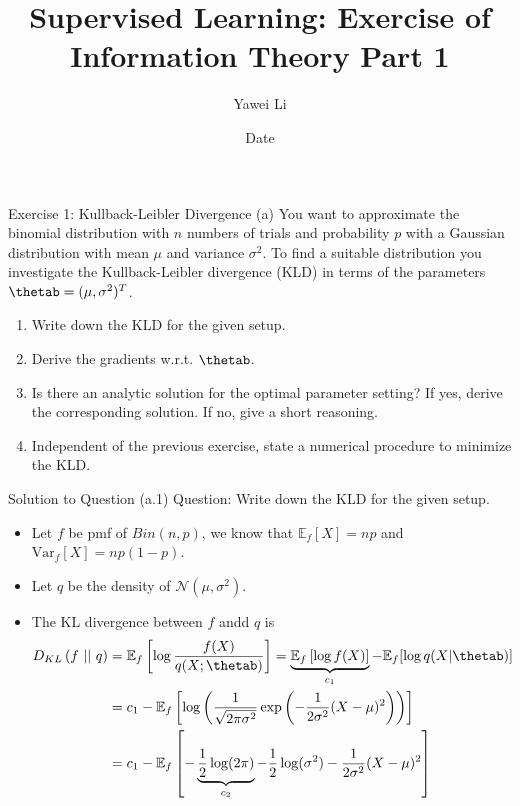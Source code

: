 \documentclass[aspectratio=169]{beamer}
\title[]{\textbf{Supervised Learning: Exercise of \\ Information Theory Part 1}}
\author{Yawei Li}
\institute[LMU]
{
\\
  \texttt{yawei.li@stat.uni-muenchen.de}
}
\date{Date}
\newcommand{\kld}[1]{D_{KL}\left(#1\right)}
\newcommand{\Ef}{\mathbb{E}_f}
\newcommand{\Varf}{\mathrm{Var}_f}
\begin{document}
\begin{frame}
\titlepage

\end{frame}


\begin{frame}{Exercise 1: Kullback-Leibler Divergence}
	(a) You want to approximate the binomial distribution with $n$ numbers of trials and probability $p$ with a Gaussian distribution with mean $\mu$ and variance $\sigma^2$. To find a suitable distribution you investigate the Kullback-Leibler divergence (KLD) in terms of the parameters $\thetab = (\mu, \sigma^2)^T$.
	\begin{enumerate}
		\item Write down the KLD for the given setup.
		\item Derive the gradients w.r.t. $\thetab$.
		\item Is there an analytic solution for the optimal parameter setting? If yes, derive the corresponding solution. If no, give a short reasoning.
		\item Independent of the previous exercise, state a numerical procedure to minimize the KLD.
	\end{enumerate}
\end{frame}

\begin{frame}{Solution to Question (a.1)}
	\small
	Question: Write down the KLD for the given setup.
	
	\begin{itemize}
		\item Let $f$ be pmf of $Bin(n, p)$, we know that $\Ef[X] = np$ and $\Varf[X] = np (1 - p)$.
		\item Let $q$ be the density of $\mathcal{N}(\mu, \sigma^2)$.
		\item The KL divergence between $f$ andd $q$ is
		\begin{align*}
			\kld{f \ || \ q} 
			&= \Ef \left[ \log \frac{f(X)}{q(X; \thetab)} \right] = \underbrace{\Ef \left[ \log f(X) \right]}_{c_1} - \Ef [\log q(X|\thetab)] \\
			&= c_1 - \Ef \left[ \log \left( \frac{1}{\sqrt{2 \pi \sigma^2}} \exp \left( - \frac{1}{2\sigma^2} (X - \mu)^2 \right)  \right) \right] \\
			&= c_1 - \Ef \left[ - \underbrace{\frac{1}{2} \log(2\pi)}_{c_2} - \frac{1}{2} \log (\sigma^2) - \frac{1}{2\sigma^2} (X - \mu)^2 \right]
		\end{align*}
	\end{itemize}
	
\end{frame}
\end{document}
